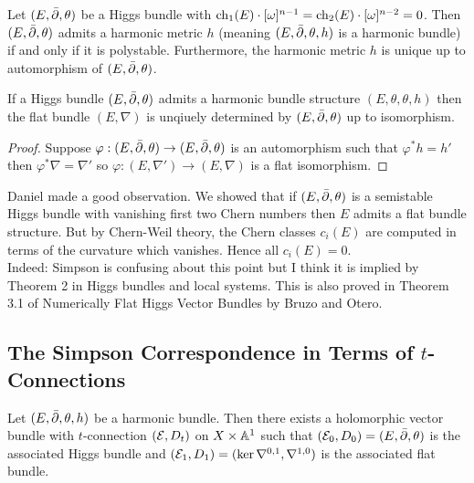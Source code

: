 \documentclass[12pt]{article}
\begin{document}
\begin{theorem}
Let $(E, \bar{\partial}, \theta)$ be a Higgs bundle with $\mathrm{ch}_1(E) \cdot [\omega]^{n-1} = \mathrm{ch}_2(E) \cdot [\omega]^{n-2} = 0$. Then $(E, \bar{\partial}, \theta)$ admits a harmonic metric $h$ (meaning $(E, \bar{\partial}, \theta, h)$ is a harmonic bundle) if and only if it is polystable. Furthermore, the harmonic metric $h$ is unique up to automorphism of $(E, \bar{\partial}, \theta)$.
\end{theorem}

\begin{cor}
If a Higgs bundle $(E, \bar{\partial}, \theta)$ admits a harmonic bundle structure $(E, \theta, \theta, h)$ then the flat bundle $(E, \nabla)$ is unqiuely determined by $(E, \bar{\partial}, \theta)$ up to isomorphism.
\end{cor}

\begin{proof}
Suppose $\varphi : (E, \bar{\partial}, \theta) \to (E, \bar{\partial}, \theta)$ is an automorphism such that $\varphi^* h = h'$ then $\varphi^* \nabla = \nabla'$ so $\varphi : (E, \nabla') \to (E, \nabla)$ is a flat isomorphism.
\end{proof}


Daniel made a good observation. We showed that if $(E, \bar{\partial}, \theta)$ is a semistable Higgs bundle with vanishing first two Chern numbers then $E$ admits a flat bundle structure. But by Chern-Weil theory, the Chern classes $c_i(E)$ are computed in terms of the curvature which vanishes. Hence all $c_i(E) = 0$.
\bigskip\\
Indeed: Simpson is confusing about this point but I think it is implied by Theorem 2 in Higgs bundles and local systems. This is also proved in Theorem 3.1 of Numerically Flat Higgs Vector Bundles by Bruzo and Otero.  

\subsection{The Simpson Correspondence in Terms of $t$-Connections}

\begin{prop}
Let $(E, \bar{\partial}, \theta, h)$ be a harmonic bundle. Then there exists a holomorphic vector bundle with $t$-connection $(\mathcal{E}, D_t)$ on $X \times \mathbb{A}^1$ such that $(\mathcal{E}_0, D_0) = (E, \bar{\partial}, \theta)$ is the associated Higgs bundle and $(\mathcal{E}_1, D_1) = (\ker{\nabla^{0,1}}, \nabla^{1,0})$ is the associated flat bundle.
\end{prop}
\end{document}
